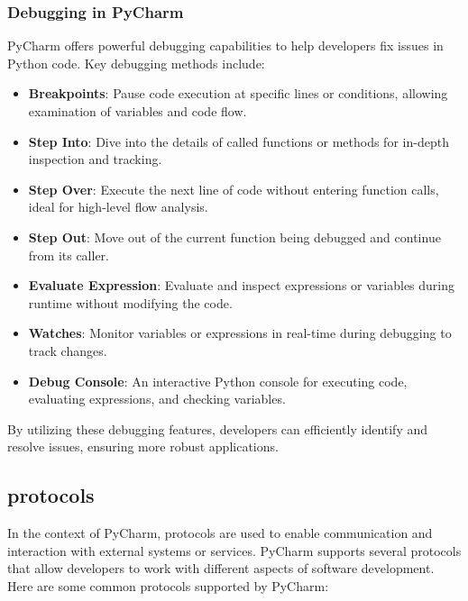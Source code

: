 \subsubsection{Debugging in PyCharm}


PyCharm offers powerful debugging capabilities to help developers fix issues in Python code. Key debugging methods include:

\begin{itemize}
	\item \textbf{Breakpoints}: Pause code execution at specific lines or conditions, allowing examination of variables and code flow.
	\item \textbf{Step Into}: Dive into the details of called functions or methods for in-depth inspection and tracking.
	\item \textbf{Step Over}: Execute the next line of code without entering function calls, ideal for high-level flow analysis.
	\item \textbf{Step Out}: Move out of the current function being debugged and continue from its caller.
	\item \textbf{Evaluate Expression}: Evaluate and inspect expressions or variables during runtime without modifying the code.
	\item \textbf{Watches}: Monitor variables or expressions in real-time during debugging to track changes.
	\item \textbf{Debug Console}: An interactive Python console for executing code, evaluating expressions, and checking variables.
\end{itemize}

By utilizing these debugging features, developers can efficiently identify and resolve issues, ensuring more robust applications.

\subsection{protocols}


In the context of PyCharm, protocols are used to enable communication and interaction with external systems or services. PyCharm supports several protocols that allow developers to work with different aspects of software development. Here are some common protocols supported by PyCharm:

